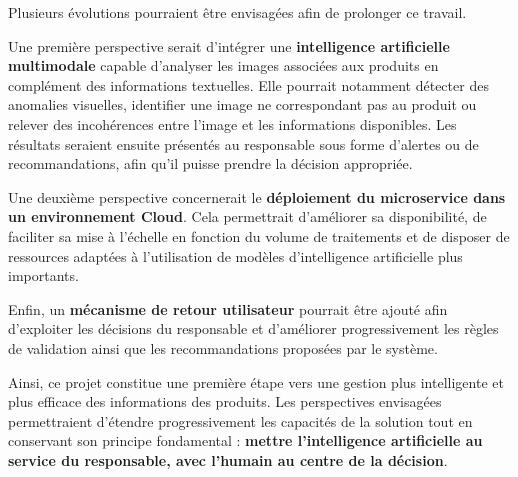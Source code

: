 Plusieurs évolutions pourraient être envisagées afin de prolonger ce travail.

Une première perspective serait d'intégrer une \textbf{intelligence artificielle multimodale} capable d'analyser les images associées aux produits en complément des informations textuelles. Elle pourrait notamment détecter des anomalies visuelles, identifier une image ne correspondant pas au produit ou relever des incohérences entre l'image et les informations disponibles. Les résultats seraient ensuite présentés au responsable sous forme d'alertes ou de recommandations, afin qu'il puisse prendre la décision appropriée.

Une deuxième perspective concernerait le \textbf{déploiement du microservice dans un environnement Cloud}. Cela permettrait d'améliorer sa disponibilité, de faciliter sa mise à l'échelle en fonction du volume de traitements et de disposer de ressources adaptées à l'utilisation de modèles d'intelligence artificielle plus importants.

Enfin, un \textbf{mécanisme de retour utilisateur} pourrait être ajouté afin d'exploiter les décisions du responsable et d'améliorer progressivement les règles de validation ainsi que les recommandations proposées par le système.

Ainsi, ce projet constitue une première étape vers une gestion plus intelligente et plus efficace des informations des produits. Les perspectives envisagées permettraient d'étendre progressivement les capacités de la solution tout en conservant son principe fondamental : \textbf{mettre l'intelligence artificielle au service du responsable, avec l'humain au centre de la décision}.